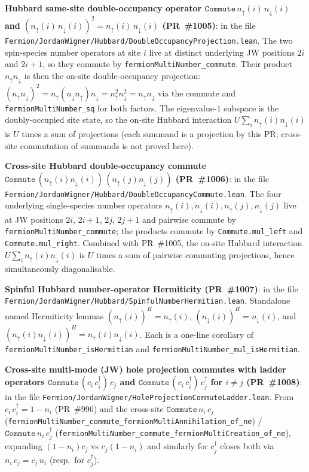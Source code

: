 \documentclass[a4paper,11pt]{article}
\begin{document}
\textbf{Hubbard same-site double-occupancy operator
$\texttt{Commute}\,n_\uparrow(i)\,n_\downarrow(i)$ and
$(n_\uparrow(i)\,n_\downarrow(i))^2 = n_\uparrow(i)\,
n_\downarrow(i)$ (PR~\#1005)}: in the file
\texttt{Fermion/JordanWigner/Hubbard/DoubleOccupancyProjection.lean}.
The two spin-species number operators at site $i$ live at
distinct underlying JW positions $2i$ and $2i+1$, so they
commute by \texttt{fermionMultiNumber\_commute}. Their product
$n_\uparrow n_\downarrow$ is then the on-site
double-occupancy projection: $(n_\uparrow n_\downarrow)^2 =
n_\uparrow (n_\downarrow n_\uparrow) n_\downarrow =
n_\uparrow^2 n_\downarrow^2 = n_\uparrow n_\downarrow$ via the
commute and \texttt{fermionMultiNumber\_sq} for both factors.
The eigenvalue-$1$ subspace is the doubly-occupied site
state, so the on-site Hubbard interaction
$U \sum_i n_\uparrow(i) n_\downarrow(i)$ is $U$ times a sum
of projections (each summand is a projection by this PR;
cross-site commutation of summands is not proved here).

\textbf{Cross-site Hubbard double-occupancy commute
$\texttt{Commute}\,(n_\uparrow(i) n_\downarrow(i))\,
(n_\uparrow(j) n_\downarrow(j))$ (PR~\#1006)}: in the file
\texttt{Fermion/JordanWigner/Hubbard/DoubleOccupancyCommute.lean}.
The four underlying single-species number operators
$n_\uparrow(i), n_\downarrow(i), n_\uparrow(j), n_\downarrow(j)$
live at JW positions $2i$, $2i+1$, $2j$, $2j+1$ and pairwise
commute by \texttt{fermionMultiNumber\_commute}; the products
commute by \texttt{Commute.mul\_left} and
\texttt{Commute.mul\_right}. Combined with PR~\#1005, the
on-site Hubbard interaction $U\sum_i n_\uparrow(i)
n_\downarrow(i)$ is $U$ times a sum of pairwise commuting
projections, hence simultaneously diagonalisable.

\textbf{Spinful Hubbard number-operator Hermiticity (PR~\#1007)}:
in the file
\texttt{Fermion/JordanWigner/Hubbard/SpinfulNumberHermitian.lean}.
Standalone named Hermiticity lemmas
$(n_\uparrow(i))^H = n_\uparrow(i)$,
$(n_\downarrow(i))^H = n_\downarrow(i)$, and
$(n_\uparrow(i) n_\downarrow(i))^H = n_\uparrow(i)
n_\downarrow(i)$. Each is a one-line corollary of
\texttt{fermionMultiNumber\_isHermitian} and
\texttt{fermionMultiNumber\_mul\_isHermitian}.

\textbf{Cross-site multi-mode (JW) hole projection commutes
with ladder operators
$\texttt{Commute}\,(c_i\,c_i^\dagger)\,c_j$ and
$\texttt{Commute}\,(c_i\,c_i^\dagger)\,c_j^\dagger$ for $i\neq j$
(PR~\#1008)}: in the file
\texttt{Fermion/JordanWigner/HoleProjectionCommuteLadder.lean}.
From $c_i\,c_i^\dagger = 1 - n_i$ (PR~\#996) and the cross-site
$\texttt{Commute}\,n_i\,c_j$
(\texttt{fermionMultiNumber\_commute\_fermionMultiAnnihilation\_of\_ne})
/ $\texttt{Commute}\,n_i\,c_j^\dagger$
(\texttt{fermionMultiNumber\_commute\_fermionMultiCreation\_of\_ne}),
expanding $(1-n_i)c_j$ vs $c_j(1-n_i)$ and similarly for
$c_j^\dagger$ closes both via $n_i\,c_j = c_j\,n_i$ (resp.\ for
$c_j^\dagger$).
\end{document}
